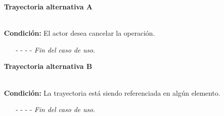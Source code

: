 \hypertarget{CU12-1-1-3:TAA}{\textbf{Trayectoria alternativa A}}\\
\noindent \textbf{Condición:} El actor desea cancelar la operación.
\begin{enumerate}
	\UCpaso[\UCactor] Oprime el botón  de la pantalla emergente.
	\UCpaso[\UCsist] Muestra la pantalla .
	\item[- -] - - {\em {Fin del caso de uso}}.%
\end{enumerate}
	\hypertarget{CU12-1-1-3:TAB}{\textbf{Trayectoria alternativa B}}\\
	\noindent \textbf{Condición:} La trayectoria está siendo referenciada en algún elemento.
	\begin{enumerate}
		\UCpaso[\UCsist] Muestra el mensaje  en la pantalla .
		\item[- -] - - {\em {Fin del caso de uso}}.
	\end{enumerate}

